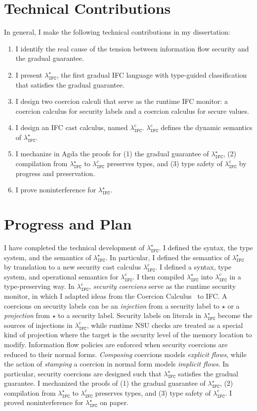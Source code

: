 \documentclass[10pt, letterpaper]{article}
\newcommand{\Surface}{\ensuremath{\lambda_{\mathtt{IFC}}^\star}\xspace}
\newcommand{\CC}{\ensuremath{\lambda_{\mathtt{IFC}}^{c}}\xspace}
\newcommand{\key}[1]{\ensuremath{\mathtt{#1}}}
\newcommand{\unk}{\key{\star}\xspace}
\begin{document}
\section{Technical Contributions}
\label{sec:contributions}

In general, I make the following technical contributions in my dissertation:

\begin{enumerate}
\item I identify the real cause of the tension between information flow
  security and the gradual guarantee.
\item I present \Surface, the first gradual IFC language with type-guided
  classification that satisfies the gradual guarantee.
\item I design two coercion calculi that serve as the runtime IFC monitor:
  a coercion calculus for security labels and a coercion calculus for secure
  values.
\item I design an IFC cast calculus, named \CC. \CC defines the dynamic
  semantics of \Surface.
\item I mechanize in Agda the proofs for (1) the gradual guarantee of
  \Surface, (2) compilation from \Surface to \CC preserves types, and (3) type
  safety of \CC by progress and preservation.
\item I prove noninterference for \Surface.
\end{enumerate}

\section{Progress and Plan}
\label{sec:progress-and-plan}

I have completed the technical development of \Surface. I defined the syntax,
the type system, and the semantics of \Surface. In particular, I defined the
semantics of \Surface by translation to a new security cast calculus \CC. I
defined a syntax, type system, and operational semantics for \CC. I then
compiled \Surface into \CC in a type-preserving way. In \CC, \textit{security
  coercions} serve as the runtime security monitor, in which I adapted ideas
from the Coercion Calculus~\citep{Henglein:1994nz,Herman:2010aa} to IFC. A
coercions on security labels can be an \textit{injection} from a security label
to \unk or a \textit{projection} from \unk to a security label. Security labels
on literals in \Surface become the sources of injections in \CC, while runtime
NSU checks are treated as a special kind of projection where the target is the
security level of the memory location to modify. Information flow policies are
enforced when security coercions are reduced to their normal forms.
\textit{Composing} coercions models \textit{explicit flows}, while the action of
\textit{stamping} a coercion in normal form models \textit{implicit flows}. In
particular, security coercions are designed such that \Surface satisfies the
gradual guarantee. I mechanized the proofs of (1) the gradual guarantee of
\Surface, (2) compilation from \Surface to \CC preserves types, and (3) type
safety of \CC. I proved noninterference for \Surface on paper.
\end{document}

